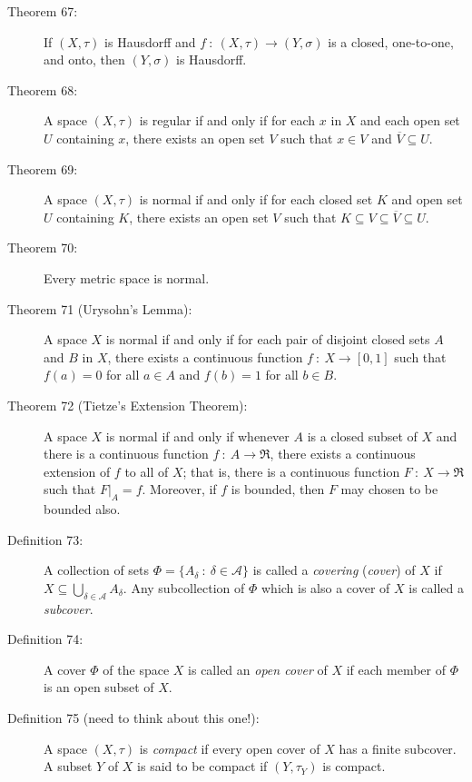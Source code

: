 \documentclass{article}
\begin{document}
\begin{description}
  \item[Theorem 67:] If $(X,\tau)$ is Hausdorff and $f \ : \ (X,\tau) \rightarrow (Y,\sigma)$ is a closed, one-to-one, and onto, then $(Y,\sigma)$ is Hausdorff.

  \item[Theorem 68:] A space $(X,\tau)$ is regular if and only if for each $x$ in $X$ and each open set $U$ containing $x$, there exists an open set $V$ such that $x \in V$ and $\overline{V} \subseteq U$.

  \item[Theorem 69:] A space $(X,\tau)$ is normal if and only if for each closed set $K$ and open set $U$ containing $K$, there exists an open set $V$ such that $K \subseteq V \subseteq \overline{V} \subseteq U$.

  \item[Theorem 70:] Every metric space is normal.

  \item[Theorem 71 (Urysohn's Lemma):] A space $X$ is normal if and only if for each pair of disjoint closed sets $A$ and $B$ in $X$, there exists a continuous function $f \ : \ X \rightarrow [0,1]$ such that $f(a)=0$ for all $a \in A$ and $f(b)=1$ for all $b \in B$.

  \item[Theorem 72 (Tietze's Extension Theorem):] A space $X$ is normal if and only if whenever $A$ is a closed subset of $X$ and there is a continuous function $f \ : \ A \rightarrow \Re$, there exists a continuous extension of $f$ to all of $X$; that is, there is a continuous function $F \ : \ X \rightarrow \Re$ such that $F|_{A} = f$. Moreover, if $f$ is bounded, then $F$ may chosen to be bounded also.

  \item[Definition 73:] A collection of sets $\Phi = \{ A_{\delta} \ : \ \delta \in \mathcal{A} \}$ is called a \emph{covering} (\emph{cover}) of $X$ if $\displaystyle{ X \subseteq \bigcup_{\delta \in \mathcal{A}} A_{\delta} }$. Any subcollection of $\Phi$ which is also a cover of $X$ is called a \emph{subcover}.

  \item[Definition 74:] A cover $\Phi$ of the space $X$ is called an \emph{open cover} of $X$ if each member of $\Phi$ is an open subset of $X$.

  \item[Definition 75 (need to think about this one!):] A space $(X,\tau)$ is \emph{compact} if every open cover of $X$ has a finite subcover. A subset $Y$ of $X$ is said to be compact if $(Y,\tau _{Y})$ is compact.


\end{description}
\end{document}
